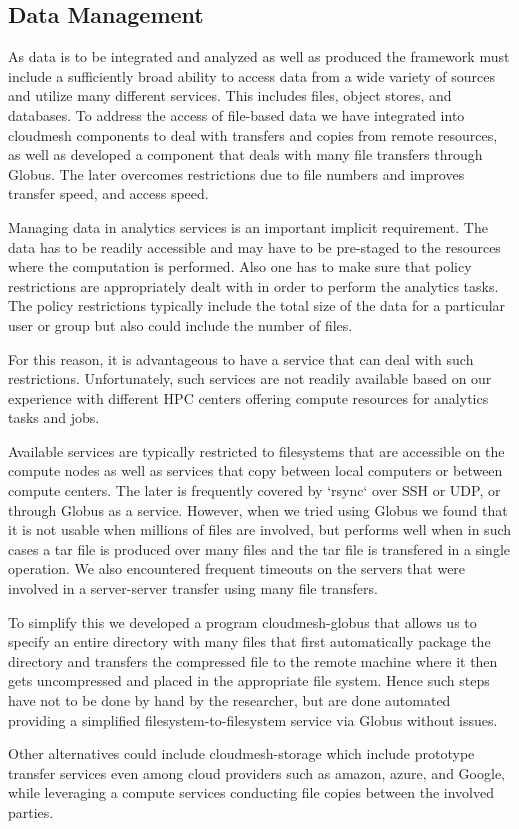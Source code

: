 \subsection{Data Management}
\label{sec:data}

As data is to be integrated and analyzed as well as produced the
framework must include a sufficiently broad ability to access data from
a wide variety of sources and utilize many different services.  This
includes files, object stores, and databases.  To address the access of
file-based data we have integrated into cloudmesh components to deal
with transfers and copies from remote resources, as well as developed
a component that deals with many file transfers through Globus. The
later overcomes restrictions due to file numbers and improves transfer
speed, and access speed.

Managing data in analytics services is an important implicit
requirement. The data has to be readily accessible and may have to be
pre-staged to the resources where the computation is performed. Also
one has to make sure that policy restrictions are appropriately dealt
with in order to perform the analytics tasks. The policy restrictions
typically include the total size of the data for a particular user or
group but also could include the number of files.

For this reason, it is advantageous to have a service that can deal with
such restrictions. Unfortunately, such services are not readily
available based on our experience with different HPC centers offering
compute resources for analytics tasks and jobs.

Available services are typically restricted to filesystems that are
accessible on the compute nodes as well as services that copy between
local computers or between compute centers. The later is frequently
covered by `rsync` over SSH or UDP, or through
Globus \cite{www-globus-transfer} as a service. However, when we tried
using Globus we found that it is not usable when millions of files are
involved, but performs well when in such cases a tar file is produced
over many files and the tar file is transfered in a single
operation. We also encountered frequent timeouts on the servers that
were involved in a server-server transfer using many file transfers.

To simplify this we developed a program
cloudmesh-globus \cite{cloudmesh-globus} that allows us to specify an
entire directory with many files that first automatically package the
directory and transfers the compressed file to the remote machine
where it then gets uncompressed and placed in the appropriate file
system. Hence such steps have not to be done by hand by the
researcher, but are done automated providing a simplified
filesystem-to-filesystem service via Globus without issues.

Other alternatives could include
cloudmesh-storage \cite{cloudmesh-storage} which include prototype
transfer services even among cloud providers such as amazon, azure,
and Google, while leveraging a compute services conducting file
copies between the involved parties.


